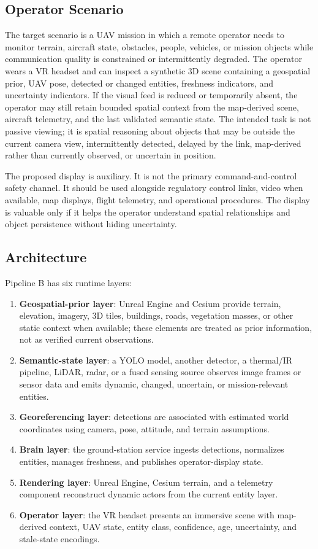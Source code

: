 \documentclass[fleqn]{VRIH2025}
\begin{document}
\subsection{Operator Scenario}

The target scenario is a UAV mission in which a remote operator needs to monitor terrain, aircraft state, obstacles, people, vehicles, or mission objects while communication quality is constrained or intermittently degraded. The operator wears a VR headset and can inspect a synthetic 3D scene containing a geospatial prior, UAV pose, detected or changed entities, freshness indicators, and uncertainty indicators. If the visual feed is reduced or temporarily absent, the operator may still retain bounded spatial context from the map-derived scene, aircraft telemetry, and the last validated semantic state. The intended task is not passive viewing; it is spatial reasoning about objects that may be outside the current camera view, intermittently detected, delayed by the link, map-derived rather than currently observed, or uncertain in position.

The proposed display is auxiliary. It is not the primary command-and-control safety channel. It should be used alongside regulatory control links, video when available, map displays, flight telemetry, and operational procedures. The display is valuable only if it helps the operator understand spatial relationships and object persistence without hiding uncertainty.

\subsection{Architecture}

Pipeline B has six runtime layers:

\begin{enumerate}
    \item \textbf{Geospatial-prior layer}: Unreal Engine and Cesium provide terrain, elevation, imagery, 3D tiles, buildings, roads, vegetation masses, or other static context when available; these elements are treated as prior information, not as verified current observations.
    \item \textbf{Semantic-state layer}: a YOLO model, another detector, a thermal/IR pipeline, LiDAR, radar, or a fused sensing source observes image frames or sensor data and emits dynamic, changed, uncertain, or mission-relevant entities.
    \item \textbf{Georeferencing layer}: detections are associated with estimated world coordinates using camera, pose, attitude, and terrain assumptions.
    \item \textbf{Brain layer}: the ground-station service ingests detections, normalizes entities, manages freshness, and publishes operator-display state.
    \item \textbf{Rendering layer}: Unreal Engine, Cesium terrain, and a telemetry component reconstruct dynamic actors from the current entity layer.
    \item \textbf{Operator layer}: the VR headset presents an immersive scene with map-derived context, UAV state, entity class, confidence, age, uncertainty, and stale-state encodings.
\end{enumerate}
\end{document}
